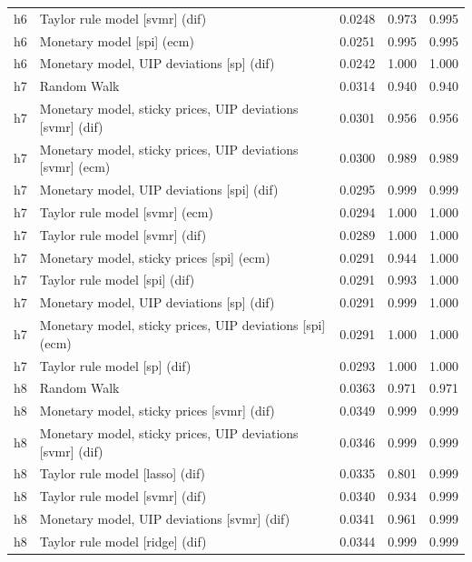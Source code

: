 \begin{ThreePartTable}
\begin{longtable}[t]{cp{5.5cm}ccc}
h6 & \raggedright Taylor rule model [svmr] (dif) & 0.0248 & 0.973 & 0.995\\
h6 & \raggedright Monetary model [spi] (ecm) & 0.0251 & 0.995 & 0.995\\
h6 & \raggedright Monetary model, UIP deviations [sp] (dif) & 0.0242 & 1.000 & 1.000\\
\addlinespace
h7 & \raggedright Random Walk & 0.0314 & 0.940 & 0.940\\
h7 & \raggedright Monetary model, sticky prices, UIP deviations [svmr] (dif) & 0.0301 & 0.956 & 0.956\\
h7 & \raggedright Monetary model, sticky prices, UIP deviations [svmr] (ecm) & 0.0300 & 0.989 & 0.989\\
h7 & \raggedright Monetary model, UIP deviations [spi] (dif) & 0.0295 & 0.999 & 0.999\\
h7 & \raggedright Taylor rule model [svmr] (ecm) & 0.0294 & 1.000 & 1.000\\
h7 & \raggedright Taylor rule model [svmr] (dif) & 0.0289 & 1.000 & 1.000\\
h7 & \raggedright Monetary model, sticky prices [spi] (ecm) & 0.0291 & 0.944 & 1.000\\
h7 & \raggedright Taylor rule model [spi] (dif) & 0.0291 & 0.993 & 1.000\\
h7 & \raggedright Monetary model, UIP deviations [sp] (dif) & 0.0291 & 0.999 & 1.000\\
h7 & \raggedright Monetary model, sticky prices, UIP deviations [spi] (ecm) & 0.0291 & 1.000 & 1.000\\
h7 & \raggedright Taylor rule model [sp] (dif) & 0.0293 & 1.000 & 1.000\\
\addlinespace
h8 & \raggedright Random Walk & 0.0363 & 0.971 & 0.971\\
h8 & \raggedright Monetary model, sticky prices [svmr] (dif) & 0.0349 & 0.999 & 0.999\\
h8 & \raggedright Monetary model, sticky prices, UIP deviations [svmr] (dif) & 0.0346 & 0.999 & 0.999\\
h8 & \raggedright Taylor rule model [lasso] (dif) & 0.0335 & 0.801 & 0.999\\
h8 & \raggedright Taylor rule model [svmr] (dif) & 0.0340 & 0.934 & 0.999\\
h8 & \raggedright Monetary model, UIP deviations [svmr] (dif) & 0.0341 & 0.961 & 0.999\\
h8 & \raggedright Taylor rule model [ridge] (dif) & 0.0344 & 0.999 & 0.999\\

\end{longtable}
\end{ThreePartTable}
